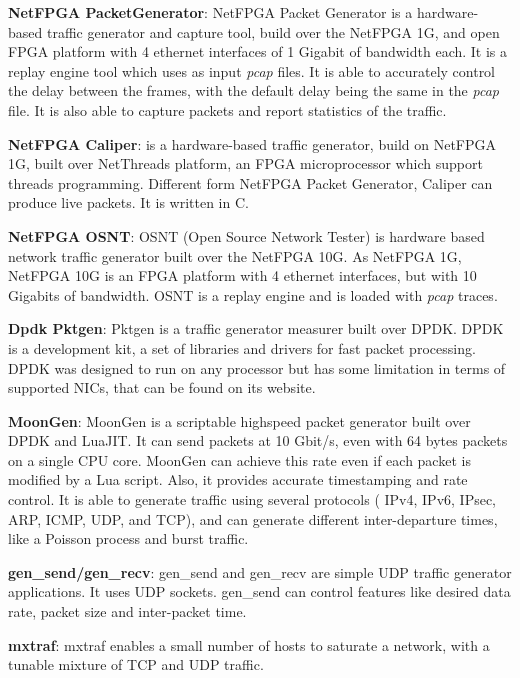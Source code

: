 \textbf{NetFPGA PacketGenerator}\cite{web-netfpgapacketgenerator}: NetFPGA Packet Generator is a hardware-based traffic generator and capture tool, build over the NetFPGA 1G, and open \acrshort{FPGA} platform with 4 ethernet interfaces of 1 Gigabit of bandwidth each. It is a replay engine tool which uses as input \textit{pcap} files. It is able to accurately control the delay between the frames, with the default delay being the same in the \textit{pcap} file. It is also able to capture packets and report statistics of the traffic. 


\textbf{NetFPGA Caliper}\cite{web-caliper}: is a hardware-based traffic generator, build on NetFPGA 1G, built over NetThreads platform, an FPGA microprocessor which support threads programming. Different form NetFPGA Packet Generator, Caliper can produce live packets. It is written in C. 

\textbf{NetFPGA OSNT}\cite{web-osnt}:  OSNT (Open Source Network Tester) is hardware based network traffic generator built over the NetFPGA 10G. As NetFPGA 1G, NetFPGA 10G is an FPGA platform with 4 ethernet interfaces, but with 10 Gigabits of bandwidth. OSNT is a replay engine and is loaded with \textit{pcap} traces. 


\textbf{Dpdk Pktgen}\cite{web-dpdk-pktgen}: Pktgen is a traffic generator measurer built over DPDK. DPDK is a development kit, a set of libraries and drivers for fast packet processing. DPDK was designed to run on any processor but has some limitation in terms of supported NICs, that can be found on its website.

\textbf{MoonGen}\cite{moongen-paper}\cite{web-moongen}: MoonGen is a scriptable highspeed packet generator built over DPDK and LuaJIT. It can send packets at 10 Gbit/s, even with 64 bytes packets on a single CPU core. MoonGen can achieve this rate even if each packet is modified by a Lua script. Also, it provides accurate timestamping and rate control. It is able to generate traffic using several protocols ( IPv4, IPv6, IPsec, ARP, ICMP, UDP, and TCP), and can generate different inter-departure times, like a Poisson process and burst traffic. 

\textbf{gen\_send/gen\_recv}\cite{web-gensend-genrecv}:  gen\_send and gen\_recv are simple UDP traffic generator applications. It uses UDP sockets. gen\_send can control features like desired data rate, packet size and inter-packet time. 

\textbf{mxtraf}\cite{web-mxtraf}:  mxtraf enables a small number of hosts to saturate a network, with a tunable mixture of TCP and UDP traffic.

